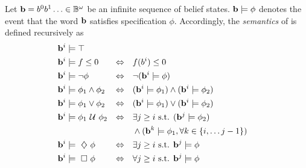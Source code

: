 \documentclass[conference]{IEEEtran}
\begin{document}
    \begin{definition}
    \label{def:gdtl-semantics}
    Let $\mathbf{b} = b^0b^1 \ldots \in \mathbb{B}^{\omega}$
    be an infinite sequence of belief states. $\mathbf{b} \models \phi$ denotes the event that the word $\mathbf{b}$ satisfies specification $\phi$. Accordingly, the {\em semantics} of \DTL is defined recursively as
    \begin{align*}
    &\BF{b}^i \models  \top  & \\
    &\BF{b}^i \models f \leq 0 & \Equiv\quad & f(b^i) \leq 0\\ %
    &\BF{b}^i \models \notltl \phi & \Equiv\quad & \notltl (\BF{b}^i \models \phi) \\
    &\BF{b}^i \models \phi_1 \andltl  \phi_2  & \Equiv\quad & ( \BF{b}^i \models \phi_1 ) \andltl ( \BF{b}^i \models \phi_2 ) \\
    &\BF{b}^i \models \phi_1 \orltl  \phi_2  & \Equiv\quad & ( \BF{b}^i \models \phi_1 ) \orltl ( \BF{b}^i \models \phi_2 ) \\
    &\BF{b}^i \models  \phi_1 \Until \phi_2 & \Equiv\quad & \exists j \geq i \text{ s.t. } ( \BF{b}^j \models \phi_2 ) \\
    & & & \andltl (\BF{b}^k \models \phi_1, \forall k \in \{i, \ldots j-1\})\\
    &\BF{b}^i \models \Event \phi  & \Equiv\quad & \exists j \geq i \text{ s.t. } \BF{b}^j \models \phi \\
    &\BF{b}^i \models \Always \phi  & \Equiv\quad & \forall j \geq i \text{ s.t. } \BF{b}^j \models \phi
    \end{align*}
    
    \end{definition}


	
	
\end{document}
